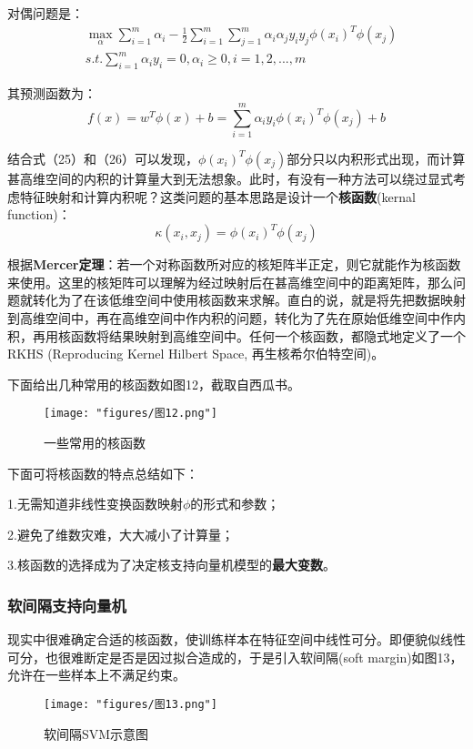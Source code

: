 对偶问题是：
\begin{equation}\begin{aligned}&\max_\alpha\sum_{i=1}^m\alpha_i-\frac12\sum_{i=1}^m\sum_{j=1}^m\alpha_i\alpha_jy_iy_j\phi(x_i)^T\phi(x_j)\\&s.t.\sum_{i=1}^m\alpha_iy_i=0,\alpha_i\geq0,i=1,2,...,m\end{aligned}\end{equation}

其预测函数为：
\begin{equation}f(x)=w^T\phi(x)+b=\sum_{i=1}^m\alpha_iy_i\phi(x_i)^T\phi(x_j)+b\end{equation}

结合式（25）和（26）可以发现，$\phi(x_i)^T\phi(x_j)$部分只以内积形式出现，而计算甚高维空间的内积的计算量大到无法想象。此时，有没有一种方法可以绕过显式考虑特征映射和计算内积呢？这类问题的基本思路是设计一个\textbf{核函数}(kernal function)：
\begin{equation}\kappa(x_i,x_j)=\phi(x_i)^T\phi(x_j)\end{equation}

根据\textbf{Mercer定理}：若一个对称函数所对应的核矩阵半正定，则它就能作为核函数来使用。这里的核矩阵可以理解为经过映射后在甚高维空间中的距离矩阵，那么问题就转化为了在该低维空间中使用核函数来求解。直白的说，就是将先把数据映射到高维空间中，再在高维空间中作内积的问题，转化为了先在原始低维空间中作内积，再用核函数将结果映射到高维空间中。任何一个核函数，都隐式地定义了一个RKHS (Reproducing Kernel Hilbert Space, 再生核希尔伯特空间)。

下面给出几种常用的核函数如图12，截取自西瓜书。
\begin{figure}[ht] %
	\centering
	\texttt{[image: "figures/图12.png"]} %
	\caption{一些常用的核函数} %
	\label{fig:example} %
\end{figure}

下面可将核函数的特点总结如下：

1.无需知道非线性变换函数映射$\phi$的形式和参数；

2.避免了维数灾难，大大减小了计算量；

3.核函数的选择成为了决定核支持向量机模型的\textbf{最大变数}。

\subsubsection{软间隔支持向量机}
现实中很难确定合适的核函数，使训练样本在特征空间中线性可分。即便貌似线性可分，也很难断定是否是因过拟合造成的，于是引入软间隔(soft margin)如图13，允许在一些样本上不满足约束。
\begin{figure}[hb] %
	\centering
	\texttt{[image: "figures/图13.png"]} %
	\caption{软间隔SVM示意图} %
	\label{fig:example} %
\end{figure}

